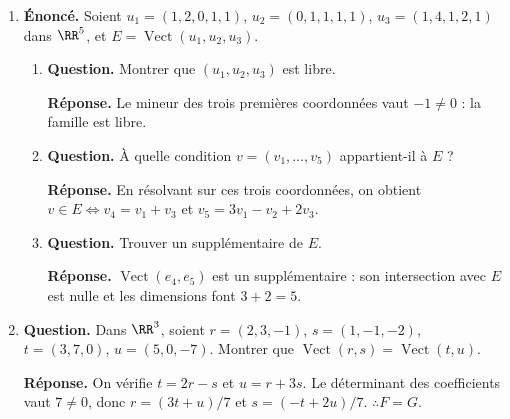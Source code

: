 \documentclass[12pt, a4paper]{article}
\begin{document}
\begin{enumerate}[label=6.\arabic*., start=105]
\begin{minipage}[t]{\linewidth}
\begin{enumerate}[\arabic*.]
  \item \textbf{Question.} Déterminer $E\cap F$.
\par\smallskip
\textbf{Réponse.} Si $(t,t,-t)\in E$, $4t=0$, donc $E\cap F=\{0\}$.

  \item \textbf{Question.} Pour $u=(1,-1,1)$, $v=(3,1,7)$, montrer que $\operatorname{Vect}(u,v)\subseteq E$. A-t-on égalité ?
\par\smallskip
\textbf{Réponse.} $u,v\in E$, et ils ne sont pas colinéaires. Comme $\dim E=2$, $E=\operatorname{Vect}(u,v)$.

\end{enumerate}
\end{minipage}

  \item \begin{minipage}[t]{\linewidth}\raggedright
\textbf{Énoncé.} Soient $u_1=(1,2,0,1,1)$, $u_2=(0,1,1,1,1)$, $u_3=(1,4,1,2,1)$ dans $\RR^5$, et $E=\operatorname{Vect}(u_1,u_2,u_3)$.

\begin{enumerate}[\arabic*.]
        \item \textbf{Question.} Montrer que $(u_1,u_2,u_3)$ est libre.
\par\smallskip
\textbf{Réponse.} Le mineur des trois premières coordonnées vaut $-1\neq0$ : la famille est libre.

  \item \textbf{Question.} À quelle condition $v=(v_1,\ldots,v_5)$ appartient-il à $E$ ?
\par\smallskip
\textbf{Réponse.} En résolvant sur ces trois coordonnées, on obtient
        $v\in E\iff v_4=v_1+v_3$ et $v_5=3v_1-v_2+2v_3$.

  \item \textbf{Question.} Trouver un supplémentaire de $E$.
\par\smallskip
\textbf{Réponse.} $\operatorname{Vect}(e_4,e_5)$ est un supplémentaire : son intersection avec $E$ est nulle et les dimensions font $3+2=5$.

\end{enumerate}
\end{minipage}

  \item \begin{minipage}[t]{\linewidth}\raggedright
\textbf{Question.} Dans $\RR^3$, soient $r=(2,3,-1)$, $s=(1,-1,-2)$, $t=(3,7,0)$, $u=(5,0,-7)$. Montrer que $\operatorname{Vect}(r,s)=\operatorname{Vect}(t,u)$.
\par\smallskip
\textbf{Réponse.} On vérifie $t=2r-s$ et $u=r+3s$.
    Le déterminant des coefficients vaut $7\neq0$, donc
    $r=(3t+u)/7$ et $s=(-t+2u)/7$.
    $\therefore F=G$.
\end{minipage}


\end{enumerate}
\end{document}
